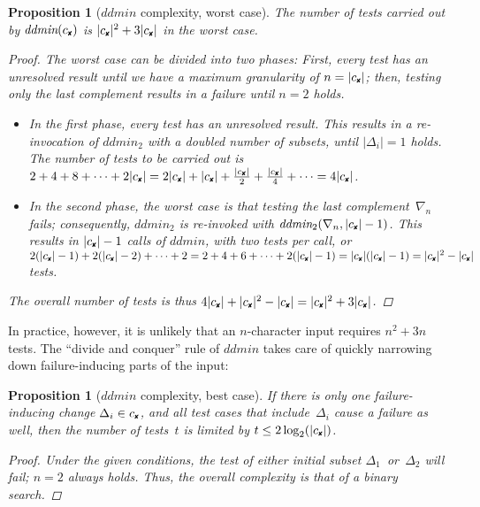 \documentclass{acm_proc_article-sp}
\newcommand{\FAIL}{\text{\ding{56}}\xspace}
\newcommand{\cfail}{{c_{\scriptscriptstyle \FAIL}}}
\newcommand{\ddmin}{\textit{ddmin}\xspace}
\theoremstyle{plain}
\newtheorem{proposition}[definition]{Proposition}
\begin{document}
\begin{proposition}[$\ddmin$ complexity, worst case]
\label{pro:ddmin-worst-complexity}
The number of tests carried out by $\ddmin(\cfail)$ is $|\cfail|^2 + 3|\cfail|$ 
in the worst case.
\begin{proof}
  The worst case can be divided into two phases: First, every test has
  an unresolved result until we have a maximum granularity of $n =
  |\cfail|$; then, testing only the last complement results in a
  failure until $n = 2$ holds.
  \begin{itemize}
  \item
    In the first phase, every test has an unresolved result.  
    This results in a re-invocation of $\ddmin_2$ with a doubled 
    number of subsets, until $|\Delta_i| = 1$ holds.  
    The number of tests to be carried out is $
    2 + 4 + 8 + \cdots + 2|\cfail| 
    = 2|\cfail| + |\cfail| + \frac{|\cfail|}{2} + \frac{|\cfail|}{4} + \cdots 
    = 4|\cfail|$.
    
  \item In the second phase, the worst case is that testing the
    \emph{last} complement~$\nabla_n$ fails; consequently, $\ddmin_2$ is
    re-invoked with $\ddmin_2(\nabla_n, |\cfail| - 1)$.  This results in
    $|\cfail| - 1$ calls of $\ddmin$, with two tests per call, or $
    2(|\cfail| - 1) + 2(|\cfail| - 2) + \cdots + 2 = 2 + 4 + 6 + \cdots +
    2(|\cfail| - 1) = |\cfail|(|\cfail| - 1) = |\cfail|^2 - |\cfail| $
    tests.
  \end{itemize}
  The overall number of tests is thus $4|\cfail| + |\cfail|^2 - |\cfail| 
  =  |\cfail|^2 + 3|\cfail|$.
\end{proof}
\end{proposition}

\noindent
In practice, however, it is unlikely that an $n$-character input
requires $n^2 + 3n$ tests.  The ``divide and conquer'' rule of
$\ddmin$ takes care of quickly narrowing down failure-inducing parts
of the input:

\begin{proposition}[$\ddmin$ complexity, best case]
\label{pro:ddmin-best-complexity}
If there is only one failure-inducing change $\Delta_i \in \cfail$, and all
test cases that include~$\Delta_i$ cause a failure as well, then the number
of tests~$t$ is limited by $t \leq 2\log_2(|\cfail|)$.
\begin{proof}
  Under the given conditions, the test of either initial subset
  $\Delta_1$~or~$\Delta_2$ will fail; $n = 2$ always holds.  Thus, the
  overall complexity is that of a binary search.
\end{proof}
\end{proposition}
\end{document}
